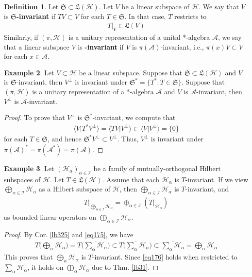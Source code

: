\documentclass[12pt,b5paper,notitlepage]{article}
\theoremstyle{definition}
\newtheorem{df}{Definition}[subsection]
\newtheorem{eg}[df]{Example}
\theoremstyle{plain}
\newcommand{\fk}{\mathfrak}
\newcommand{\ovl}{\overline}
\newcommand{\bk}[1]{\langle {#1}\rangle}
\newcommand{\scr}{\mathscr}
\newcommand{\MH}{\mathcal H}
\newcommand{\SI}{\mathscr I}
\newcommand{\SA}{\mathscr A}
\numberwithin{equation}{section}
\begin{document}
\begin{df}
Let $\fk S\subset\fk L(\MH)$. Let $V$ be a linear subspace of $\MH$. We say that $V$ is \textbf{$\pmb{\fk S}$-invariant}  if $TV\subset V$ for each $T\in\fk S$. In that case, $T$ restricts to
\begin{align*}
T|_V\in\fk L(V)
\end{align*}
Similarly, if $(\pi,\MH)$ is a unitary representation of a unital *-algebra $\scr A$, we say that a linear subspace $V$ is \textbf{\pmb{$\scr A$}-invariant} if $V$ is $\pi(\scr A)$-invariant, i.e., $\pi(x)V\subset V$ for each $x\in\scr A$.
\end{df}


\begin{eg}\label{lb328}
Let $V\subset\MH$ be a linear subspace. Suppose that $\fk S\subset\fk L(\MH)$ and $V$ is $\fk S$-invariant, then $V^\perp$ is invariant under $\fk S^*=\{T^*:T\in\fk S\}$. Suppose that $(\pi,\MH)$ is a unitary representation of a *-algebra $\scr A$ and $V$ is $\scr A$-invariant, then $V^\perp$ is $\scr A$-invariant.
\end{eg}


\begin{proof}
To prove that $V^\perp$ is $\fk S^*$-invariant, we compute that
\begin{align*}
\bk{V|T^*V^\perp}=\bk{TV|V^\perp}\subset\bk{V|V^\perp}=\{0\}
\end{align*}
for each $T\in\fk S$, and hence $\fk S^*V^\perp\subset V^\perp$. Thus, $V^\perp$ is invariant under $\pi(\scr A)^*=\pi(\SA^*)=\pi(\SA)$.
\end{proof}


\begin{eg}\label{lb326}
Let $(\MH_\alpha)_{\alpha\in\SI}$ be a family of mutually-orthogonal Hilbert subspaces of $\MH$. Let $T\in\fk L(\MH)$. Assume that each $\MH_\alpha$ is $T$-invariant. If we view $\bigoplus_{\alpha\in\SI}\MH_\alpha$ as a Hilbert subspace of $\MH$, then $\bigoplus_{\alpha\in\SI}\MH_\alpha$ is $T$-invariant, and
\begin{align}\label{eq176}
T\big|_{\bigoplus_{\alpha\in\SI}\MH_\alpha}=\oplus_{\alpha\in\SI}(T|_{\MH_\alpha})
\end{align}
as bounded linear operators on $\bigoplus_{\alpha\in\SI}\MH_\alpha$.
\end{eg}

\begin{proof}
By Cor. \ref{lb325} and \eqref{eq175}, we have
\begin{align*}
T\Big(\bigoplus_\alpha\MH_\alpha\Big)=T\Big(\ovl{\sum_\alpha\MH_\alpha}\Big)\subset \ovl{T\Big(\sum_\alpha\MH_\alpha\Big)}\subset\ovl{\sum_\alpha\MH_\alpha}=\bigoplus_\alpha\MH_\alpha
\end{align*}
This proves that $\bigoplus_\alpha\MH_\alpha$ is $T$-invariant. Since \eqref{eq176} holds when restricted to $\sum_\alpha\MH_\alpha$, it holds on $\bigoplus_\alpha\MH_\alpha$ due to Thm. \ref{lb31}.
\end{proof}
\end{document}
